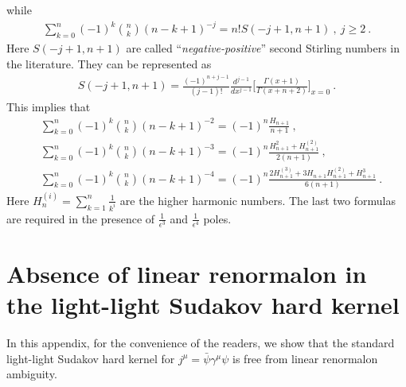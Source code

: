 \documentclass[a4paper,11pt]{article}
\begin{document}
while
\begin{align}
\sum_{k=0}^{n}(-1)^k \binom{n}{k}(n-k+1)^{-j}=n!S(-j+1,n+1) \ , \ j\ge 2 \ .
\end{align}
Here $S(-j+1,n+1)$ are called ``{\it negative-positive}'' second Stirling numbers in the literature. They can be represented as
\begin{align}
S(-j+1,n+1)=\frac{(-1)^{n+j-1}}{(j-1)!}\frac{d^{j-1}}{dx^{j-1}}\bigg[\frac{\Gamma(x+1)}{\Gamma(x+n+2)}\bigg]_{x=0} \ .
\end{align}
This implies that 
\begin{align}
&\sum_{k=0}^{n}(-1)^k \binom{n}{k}(n-k+1)^{-2}=(-1)^n\frac{H_{n+1}}{n+1} \ , \\
&\sum_{k=0}^{n}(-1)^k \binom{n}{k}(n-k+1)^{-3}=(-1)^n\frac{H_{n+1}^2+H^{(2)}_{n+1}}{2(n+1)} \ , \\ 
&\sum_{k=0}^{n}(-1)^k \binom{n}{k}(n-k+1)^{-4}=(-1)^n\frac{2H_{n+1}^{(3)}+3H_{n+1}H_{n+1}^{(2)}+H_{n+1}^3}{6(n+1)} \ .
\end{align}
Here $H^{(i)}_n=\sum_{k=1}^n\frac{1}{k^i}$ are the higher harmonic numbers. 
The last two formulas are required in the presence of $\frac{1}{\epsilon^3}$ and $\frac{1}{\epsilon^4}$ poles. 
\section{Absence of linear renormalon in the light-light Sudakov hard kernel}
In this appendix, for the convenience of the readers, we show that the standard light-light Sudakov hard kernel for $j^{\mu}=\bar \psi \gamma^{\mu} \psi$ is free from linear renormalon ambiguity.
\end{document}

